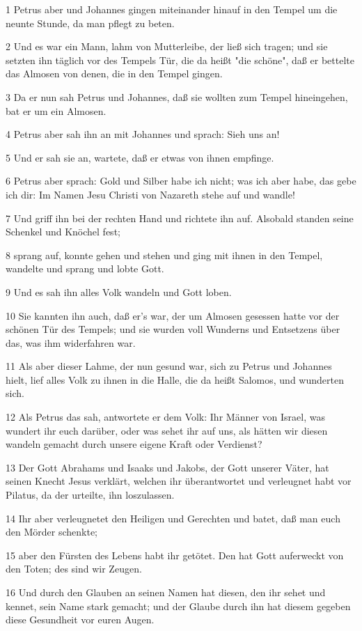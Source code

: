 \par 1 Petrus aber und Johannes gingen miteinander hinauf in den Tempel um die neunte Stunde, da man pflegt zu beten.
\par 2 Und es war ein Mann, lahm von Mutterleibe, der ließ sich tragen; und sie setzten ihn täglich vor des Tempels Tür, die da heißt "die schöne", daß er bettelte das Almosen von denen, die in den Tempel gingen.
\par 3 Da er nun sah Petrus und Johannes, daß sie wollten zum Tempel hineingehen, bat er um ein Almosen.
\par 4 Petrus aber sah ihn an mit Johannes und sprach: Sieh uns an!
\par 5 Und er sah sie an, wartete, daß er etwas von ihnen empfinge.
\par 6 Petrus aber sprach: Gold und Silber habe ich nicht; was ich aber habe, das gebe ich dir: Im Namen Jesu Christi von Nazareth stehe auf und wandle!
\par 7 Und griff ihn bei der rechten Hand und richtete ihn auf. Alsobald standen seine Schenkel und Knöchel fest;
\par 8 sprang auf, konnte gehen und stehen und ging mit ihnen in den Tempel, wandelte und sprang und lobte Gott.
\par 9 Und es sah ihn alles Volk wandeln und Gott loben.
\par 10 Sie kannten ihn auch, daß er's war, der um Almosen gesessen hatte vor der schönen Tür des Tempels; und sie wurden voll Wunderns und Entsetzens über das, was ihm widerfahren war.
\par 11 Als aber dieser Lahme, der nun gesund war, sich zu Petrus und Johannes hielt, lief alles Volk zu ihnen in die Halle, die da heißt Salomos, und wunderten sich.
\par 12 Als Petrus das sah, antwortete er dem Volk: Ihr Männer von Israel, was wundert ihr euch darüber, oder was sehet ihr auf uns, als hätten wir diesen wandeln gemacht durch unsere eigene Kraft oder Verdienst?
\par 13 Der Gott Abrahams und Isaaks und Jakobs, der Gott unserer Väter, hat seinen Knecht Jesus verklärt, welchen ihr überantwortet und verleugnet habt vor Pilatus, da der urteilte, ihn loszulassen.
\par 14 Ihr aber verleugnetet den Heiligen und Gerechten und batet, daß man euch den Mörder schenkte;
\par 15 aber den Fürsten des Lebens habt ihr getötet. Den hat Gott auferweckt von den Toten; des sind wir Zeugen.
\par 16 Und durch den Glauben an seinen Namen hat diesen, den ihr sehet und kennet, sein Name stark gemacht; und der Glaube durch ihn hat diesem gegeben diese Gesundheit vor euren Augen.
